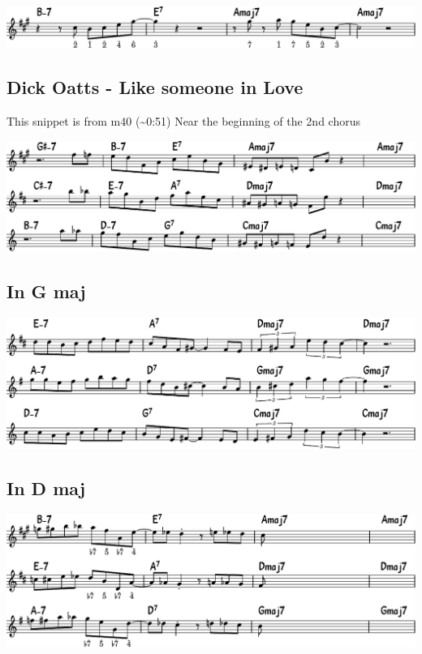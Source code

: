 \documentclass[11pt]{article}
\begin{document}
\begin{center}
\includegraphics[width=.98\linewidth]{ii-v-in-Amaj.pdf}
\end{center}

\subsection{Dick Oatts - Like someone in Love}
\label{sec:org285f8cf}
This snippet is from m40 (\textasciitilde{}0:51)
Near the beginning of the 2nd chorus

\begin{center}
\includegraphics[width=.98\linewidth]{dick_oatts.pdf}
\end{center}

\subsection{In G maj}
\label{sec:orgdaa1ef1}

\begin{center}
\includegraphics[width=.98\linewidth]{in_g_maj.pdf}
\end{center}

\subsection{In D maj}
\label{sec:orge6532a6}

\begin{center}
\includegraphics[width=.98\linewidth]{in_d_maj.pdf}
\end{center}
\end{document}
